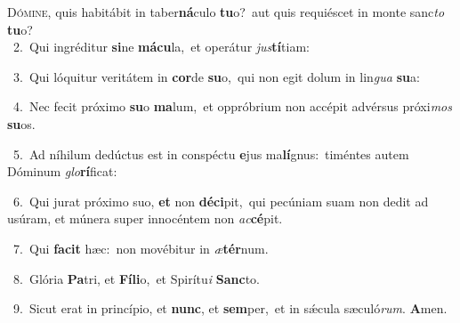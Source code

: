 \lettrine{\initial\textcolor{\initialcolor}{D}}{ómine,} quis habitábit in taber\-\textbf{ná}\-culo \textbf{tu}\-o?~\star aut quis requiéscet in monte sanc\textit{to} \textbf{tu}\-o?\\
{\numbfont\textcolor{\numbcolor}{~2.}}~Qui ingréditur \textbf{si}\-ne \textbf{má}\-\textbf{cu}la,~\star et operátur \textit{jus}\-\textbf{tí}tiam:\par
{\numbfont\textcolor{\numbcolor}{~3.}}~Qui lóquitur veritátem in \textbf{cor}\-de \textbf{su}\-o,~\star qui non egit dolum in lin\textit{gua} \textbf{su}\-a:\par
{\numbfont\textcolor{\numbcolor}{~4.}}~Nec fecit próximo \textbf{su}\-o \textbf{ma}\-lum,~\star et oppróbrium non accépit advérsus próxi\textit{mos} \textbf{su}\-os.\par
{\numbfont\textcolor{\numbcolor}{~5.}}~Ad níhilum dedúctus est in conspéctu \textbf{e}\-jus ma\-\textbf{lí}\-gnus:~\star timéntes autem Dóminum \textit{glo}\-\textbf{rí}ficat:\par
{\numbfont\textcolor{\numbcolor}{~6.}}~Qui jurat próximo suo, \textbf{et} non \textbf{dé}\-\textbf{ci}pit,~\star qui pecúniam suam non dedit ad usúram, et múnera super innocéntem non \textit{ac}\-\textbf{cé}pit.\par
{\numbfont\textcolor{\numbcolor}{~7.}}~Qui \textbf{fa}\-\textbf{cit} hæc:~\star non movébitur in \textit{æ}\-\textbf{tér}num.\par
{\numbfont\textcolor{\numbcolor}{~8.}}~Glória \textbf{Pa}\-tri, et \textbf{Fí}\-\textbf{li}o,~\star et Spirítu\textit{i} \textbf{Sanc}\-to.\par
{\numbfont\textcolor{\numbcolor}{~9.}}~Sicut erat in princípio, et \textbf{nunc}\-, et \textbf{sem}\-per,~\star et in sǽcula sæculó\-\textit{rum}\-. \textbf{A}\-men.\par
